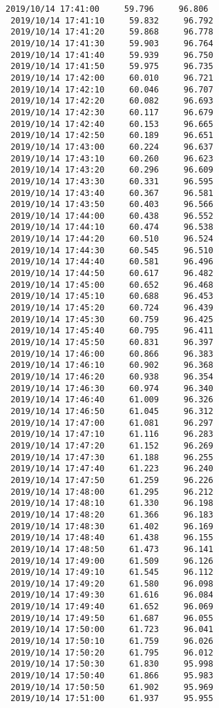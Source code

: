\documentclass[11pt]{article}
\begin{document}
\begin{Verbatim}[commandchars=\\\{\}]
 2019/10/14 17:41:00     59.796     96.806
 2019/10/14 17:41:10     59.832     96.792
 2019/10/14 17:41:20     59.868     96.778
 2019/10/14 17:41:30     59.903     96.764
 2019/10/14 17:41:40     59.939     96.750
 2019/10/14 17:41:50     59.975     96.735
 2019/10/14 17:42:00     60.010     96.721
 2019/10/14 17:42:10     60.046     96.707
 2019/10/14 17:42:20     60.082     96.693
 2019/10/14 17:42:30     60.117     96.679
 2019/10/14 17:42:40     60.153     96.665
 2019/10/14 17:42:50     60.189     96.651
 2019/10/14 17:43:00     60.224     96.637
 2019/10/14 17:43:10     60.260     96.623
 2019/10/14 17:43:20     60.296     96.609
 2019/10/14 17:43:30     60.331     96.595
 2019/10/14 17:43:40     60.367     96.581
 2019/10/14 17:43:50     60.403     96.566
 2019/10/14 17:44:00     60.438     96.552
 2019/10/14 17:44:10     60.474     96.538
 2019/10/14 17:44:20     60.510     96.524
 2019/10/14 17:44:30     60.545     96.510
 2019/10/14 17:44:40     60.581     96.496
 2019/10/14 17:44:50     60.617     96.482
 2019/10/14 17:45:00     60.652     96.468
 2019/10/14 17:45:10     60.688     96.453
 2019/10/14 17:45:20     60.724     96.439
 2019/10/14 17:45:30     60.759     96.425
 2019/10/14 17:45:40     60.795     96.411
 2019/10/14 17:45:50     60.831     96.397
 2019/10/14 17:46:00     60.866     96.383
 2019/10/14 17:46:10     60.902     96.368
 2019/10/14 17:46:20     60.938     96.354
 2019/10/14 17:46:30     60.974     96.340
 2019/10/14 17:46:40     61.009     96.326
 2019/10/14 17:46:50     61.045     96.312
 2019/10/14 17:47:00     61.081     96.297
 2019/10/14 17:47:10     61.116     96.283
 2019/10/14 17:47:20     61.152     96.269
 2019/10/14 17:47:30     61.188     96.255
 2019/10/14 17:47:40     61.223     96.240
 2019/10/14 17:47:50     61.259     96.226
 2019/10/14 17:48:00     61.295     96.212
 2019/10/14 17:48:10     61.330     96.198
 2019/10/14 17:48:20     61.366     96.183
 2019/10/14 17:48:30     61.402     96.169
 2019/10/14 17:48:40     61.438     96.155
 2019/10/14 17:48:50     61.473     96.141
 2019/10/14 17:49:00     61.509     96.126
 2019/10/14 17:49:10     61.545     96.112
 2019/10/14 17:49:20     61.580     96.098
 2019/10/14 17:49:30     61.616     96.084
 2019/10/14 17:49:40     61.652     96.069
 2019/10/14 17:49:50     61.687     96.055
 2019/10/14 17:50:00     61.723     96.041
 2019/10/14 17:50:10     61.759     96.026
 2019/10/14 17:50:20     61.795     96.012
 2019/10/14 17:50:30     61.830     95.998
 2019/10/14 17:50:40     61.866     95.983
 2019/10/14 17:50:50     61.902     95.969
 2019/10/14 17:51:00     61.937     95.955

\end{Verbatim}
\end{document}
